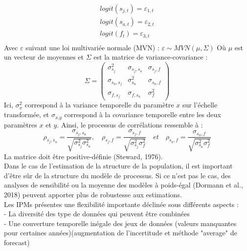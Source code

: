 \documentclass[12pt,a4paper]{article}
\begin{document}
\begin{equation}
\begin{aligned}
logit(s_{j,t}) = \varepsilon_{1,t}\\
logit(s_{a,t}) = \varepsilon_{2,t}\\
logit(f_{t}) = \varepsilon_{3,t}\\
\end{aligned}
\end{equation}
Avec $\varepsilon$ suivant une loi multivariée normale (MVN) :
$\varepsilon \sim MVN(\mu,\Sigma)$
Où $\mu$ est un vecteur de moyennes et $\Sigma$ est la matrice de variance-covariance : 
\begin{equation}
\Sigma = \begin{pmatrix}
    \sigma^2_{s_j}      & \sigma_{s_{j},s_{a}}  & \sigma_{s_{j},f}  \\ 
    \sigma_{s_{a},s_{j}}  & \sigma^2_{s_a}  & \sigma_{s_{a},f}  \\ 
    \sigma_{f,s_{j}}       & \sigma_{f,s_{a}}  & \sigma^2_{f} 
\end{pmatrix}
\end{equation}
Ici, $ \sigma^2_{\textit{x}}$  correspond à la variance temporelle du paramètre $\textit{x}$ sur l'échelle transformée, et $\sigma_{\textit{x},\textit{y}} $ correspond à la covariance temporelle entre les deux paramètres $\textit{x}$ et $\textit{y}$. Ainsi, le processus de corrélations ressemble à :
\begin{equation}
\rho_{s_{j},s_{a}}=\dfrac{\sigma_{s_{j},s_{a}}}{\sqrt{ \sigma^2_{s_j}  \sigma^2_{s_a} }},\quad \rho_{s_{j},f}=\dfrac{\sigma_{s_{j},f}}{\sqrt{ \sigma^2_{s_j}  \sigma^2_{f} }}\quad et \quad \rho_{s_{a},f}=\dfrac{\sigma_{s_{a},f}}{\sqrt{ \sigma^2_{s_a}  \sigma^2_{f} }}
\end{equation}
La matrice doit être positive-définie (Steward, 1976).\\
Dans le cas de l'estimation de la structure de la population, il est important d'être sûr de la structure du modèle de processus. Si ce n'est pas le cas, des analyses de sensibilité ou la moyenne des modèles à poids-égal (Dormann et al., 2018) peuvent apporter plus de robustesse aux estimations.\\
Les IPMs présentes une flexibilité importante déclinée sous différents aspects : \\
- La diversité des type de données qui peuvent être combinées\\
- Une couverture temporelle inégale des jeux de données (valeurs manquantes pour certaines années)(augmentation de l'incertitude et méthode "average" de forecast)\\
\end{document}

